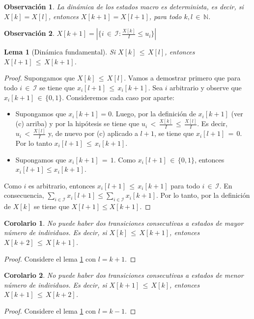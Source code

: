 \documentclass{article}
\newtheorem{coro}{Corolario}
\newtheorem{lema}{Lema}
\newtheorem{obs}{Observación}
\begin{document}
\begin{obs}\label{obs:macro}
La dinámica de los estados macro es determinista, es decir, si $X[k]=X[l]$, entonces $X[k{+}1]=X[l{+}1]$, para todo $k,l\,{\in}\,\mathbb{N}$.
\end{obs}

\begin{obs}
$X[k{+}1]=|\{i\,{\in}\,\mathcal{I}:\frac{X[k]}{I}\leq u_i\}|$
\end{obs}

\begin{lema}[Dinámica fundamental]\label{lema:mortal}
Si $X[k]\,{\leq}\,X[l]$, entonces $X[l{+}1]\,{\leq}\,X[k{+}1]$.
\end{lema}

\begin{proof}
Supongamos que $X[k]\,{\leq}\,X[l]$. Vamos a demostrar primero que para todo $i\,{\in}\,\mathcal{I}$ se tiene que $x_i[l{+}1]\,{\leq}\, x_i[k{+}1]$. Sea $i$ arbitrario y observe que $x_i[k{+}1]\,{\in}\,\{0, 1\}$. Consideremos cada caso por aparte:
%
\begin{itemize}
\item Supongamos que $x_i[k{+}1]=0$. Luego, por la definición de $x_i[k{+}1]$ (ver (c) arriba) y por la hipótesis se tiene que $u_i\,{<}\,\frac{X[k]}{I}\,{\leq}\,\frac{X[l]}{I}$. Es decir, $u_i\,{<}\,\frac{X[l]}{I}$ y, de nuevo por (c) aplicado a $l{+}1$, se tiene que $x_i[l{+}1]\,{=}\,0$. Por lo tanto $x_i[l{+}1]\,{\leq}\,x_i[k{+}1]$.
\item Supongamos que $x_i[k{+}1]\,{=}\,1$. Como $x_i[l{+}1]\,{\in}\,\{0,1\}$, entonces $x_i[l{+}1]\leq x_i[k{+}1]$.
\end{itemize}
%
Como $i$ es arbitrario, entonces $x_i[l{+}1]\,{\leq}\, x_i[k{+}1]$ para todo $i\,{\in}\,\mathcal{I}$. En consecuencia, $\sum_{i\in\mathcal{I}} x_i[l{+}1]\leq \sum_{i\in\mathcal{I}} x_i[k{+}1]$. Por lo tanto, por la definición de $X[k]$ se tiene que $X[l{+}1]\leq X[k{+}1]$.
\end{proof}

\begin{coro}\label{coro:ascen}
No puede haber dos transiciones consecutivas a estados de mayor número de individuos. Es decir, si $X[k]\,{\leq}\,X[k{+}1]$, entonces $X[k{+}2]\,{\leq}\, X[k{+}1]$.
\end{coro}
\begin{proof}
Considere el lema \ref{lema:mortal} con $l=k+1$.
\end{proof}

\begin{coro}\label{coro:descen}
No puede haber dos transiciones consecutivas a estados de menor número de individuos. Es decir, si $X[k{+}1]\,{\leq}\,X[k]$, entonces $X[k{+}1]\,{\leq}\, X[k{+}2]$.
\end{coro}
\begin{proof}
Considere el lema \ref{lema:mortal} con $l=k-1$.
\end{proof}
\end{document}
